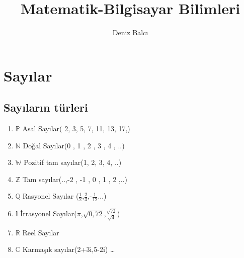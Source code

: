 \documentclass[12pt]{article}
\begin{document}
\title{Matematik-Bilgisayar Bilimleri}
\author{Deniz Balcı\\
}
\renewcommand{\today}{Mayıs 31, 2019}
\maketitle


\section{Sayılar}

\subsection*{Sayıların türleri}

\begin{enumerate}
\item $\mathbb{P}$ Asal Sayılar( 2, 3, 5, 7, 11, 13, 17,) \\
\item $\mathbb{N}$ Doğal Sayılar(0 , 1 , 2 , 3 , 4 , ..)  \\
\item $\mathbb{W}$ Pozitif tam sayılar(1, 2, 3, 4, ..)\\
\item $\mathbb{Z}$ Tam sayılar(..,-2 , -1 , 0 , 1 , 2 ,..)\\
\item $\mathbb{Q}$ Rasyonel Sayılar ($\frac{1}{2}$,$\frac{2}{3}$,-$\frac{1}{12}$...)\\
\item $\mathbb{I}$ İrrasyonel Sayılar($\pi$,$\sqrt{0,72}$,$\frac{\sqrt{72}}{\sqrt{4}}$) \\
\item $\mathbb{R}$ Reel Sayılar  \\
\item $\mathbb{C}$ Karmaşık sayılar(2+3i,5-2i) \ldots 
\end{enumerate}
\end{document}
